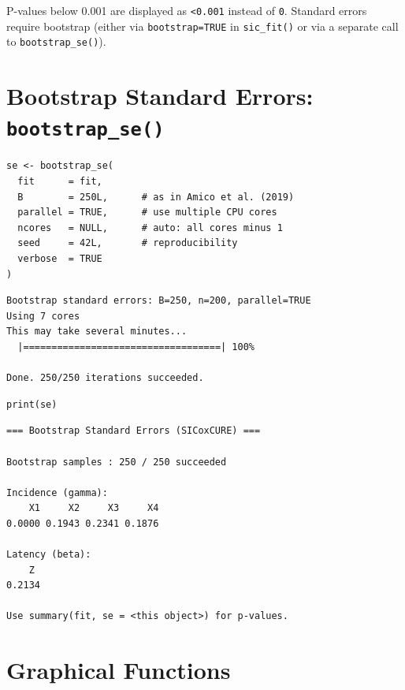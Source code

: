 \documentclass[12pt,a4paper]{article}
\begin{document}
\begin{infobox}[p-values]
P-values below 0.001 are displayed as \texttt{<0.001} instead
of \texttt{0}. Standard errors require bootstrap (either via
\texttt{bootstrap=TRUE} in \texttt{sic\_fit()} or via a
separate call to \texttt{bootstrap\_se()}).
\end{infobox}

\section{Bootstrap Standard Errors: \texttt{bootstrap\_se()}}

\begin{lstlisting}[style=Rcode,
  caption={Computing bootstrap SE (as in the article, B=250)}]
se <- bootstrap_se(
  fit      = fit,
  B        = 250L,      # as in Amico et al. (2019)
  parallel = TRUE,      # use multiple CPU cores
  ncores   = NULL,      # auto: all cores minus 1
  seed     = 42L,       # reproducibility
  verbose  = TRUE
)
\end{lstlisting}

\begin{lstlisting}[style=Routput]
Bootstrap standard errors: B=250, n=200, parallel=TRUE
Using 7 cores
This may take several minutes...
  |===================================| 100%

Done. 250/250 iterations succeeded.
\end{lstlisting}

\begin{lstlisting}[style=Rcode, caption={Display bootstrap SE}]
print(se)
\end{lstlisting}

\begin{lstlisting}[style=Routput]
=== Bootstrap Standard Errors (SICoxCURE) ===

Bootstrap samples : 250 / 250 succeeded

Incidence (gamma):
    X1     X2     X3     X4
0.0000 0.1943 0.2341 0.1876

Latency (beta):
    Z
0.2134

Use summary(fit, se = <this object>) for p-values.
\end{lstlisting}

\section{Graphical Functions}
\end{document}
